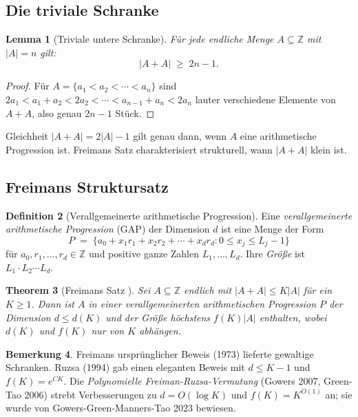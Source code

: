 \documentclass[12pt,a4paper]{amsart}
\newtheorem{theorem}{Theorem}[section]
\newtheorem{lemma}[theorem]{Lemma}
\theoremstyle{definition}
\newtheorem{definition}[theorem]{Definition}
\newtheorem{bemerkung}[theorem]{Bemerkung}
\newcommand{\Z}{\mathbb{Z}}
\newcommand{\abs}[1]{\left|#1\right|}
\begin{document}
\subsection{Die triviale Schranke}

\begin{lemma}[Triviale untere Schranke]\label{lem:trivial}
F\"{u}r jede endliche Menge $A \subseteq \Z$ mit $\abs{A} = n$ gilt:
\[
  \abs{A + A} \;\geq\; 2n - 1.
\]
\end{lemma}

\begin{proof}
F\"{u}r $A = \{a_1 < a_2 < \cdots < a_n\}$ sind
$2a_1 < a_1 + a_2 < 2a_2 < \cdots < a_{n-1} + a_n < 2a_n$
lauter verschiedene Elemente von $A + A$, also genau $2n - 1$ St\"{u}ck.
\end{proof}

Gleichheit $\abs{A + A} = 2\abs{A} - 1$ gilt genau dann, wenn $A$
eine arithmetische Progression ist.  Freimans Satz charakterisiert
strukturell, wann $\abs{A + A}$ klein ist.

\subsection{Freimans Struktursatz}

\begin{definition}[Verallgemeinerte arithmetische Progression]
Eine \emph{verallgemeinerte arithmetische Progression} (GAP) der Dimension
$d$ ist eine Menge der Form
\[
  P \;=\; \{a_0 + x_1 r_1 + x_2 r_2 + \cdots + x_d r_d :
             0 \leq x_j \leq L_j - 1\}
\]
f\"{u}r $a_0, r_1, \ldots, r_d \in \Z$ und positive ganze Zahlen
$L_1, \ldots, L_d$.  Ihre \emph{Gr\"{o}\ss{}e} ist $L_1 \cdot L_2 \cdots L_d$.
\end{definition}

\begin{theorem}[Freimans Satz \cite{Freiman1973}]\label{thm:freiman}
Sei $A \subseteq \Z$ endlich mit $\abs{A + A} \leq K \abs{A}$
f\"{u}r ein $K \geq 1$.  Dann ist $A$ in einer verallgemeinerten
arithmetischen Progression $P$ der Dimension $d \leq d(K)$ und der
Gr\"{o}\ss{}e h\"{o}chstens $f(K)\abs{A}$ enthalten,
wobei $d(K)$ und $f(K)$ nur von $K$ abh\"{a}ngen.
\end{theorem}

\begin{bemerkung}
Freimans urspr\"{u}nglicher Beweis (1973) lieferte gewaltige Schranken.
Ruzsa (1994) gab einen eleganten Beweis mit $d \leq K - 1$ und
$f(K) = e^{CK}$.  Die \emph{Polynomielle Freiman-Ruzsa-Vermutung}
(Gowers 2007, Green-Tao 2006) strebt Verbesserungen zu
$d = O(\log K)$ und $f(K) = K^{O(1)}$ an; sie wurde von
Gowers-Green-Manners-Tao 2023 bewiesen.
\end{bemerkung}
\end{document}
